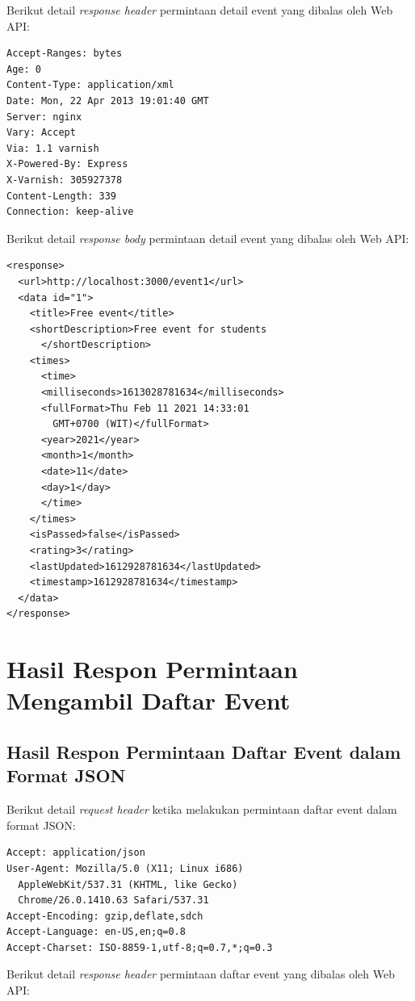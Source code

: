 \documentclass[a4paper, 12pt, oneside]{report}
\begin{document}
Berikut detail \textit{response header} permintaan detail event yang dibalas oleh Web API:

\begin{lstlisting}[frame=single]
Accept-Ranges: bytes 
Age: 0 
Content-Type: application/xml
Date: Mon, 22 Apr 2013 19:01:40 GMT 
Server: nginx 
Vary: Accept 
Via: 1.1 varnish 
X-Powered-By: Express
X-Varnish: 305927378
Content-Length: 339 
Connection: keep-alive
\end{lstlisting}

Berikut detail \textit{response body} permintaan detail event yang dibalas oleh Web API:

\begin{lstlisting}[frame=single]
<response>
  <url>http://localhost:3000/event1</url>
  <data id="1">
    <title>Free event</title>
    <shortDescription>Free event for students
      </shortDescription>
    <times>
      <time>
      <milliseconds>1613028781634</milliseconds>
      <fullFormat>Thu Feb 11 2021 14:33:01 
        GMT+0700 (WIT)</fullFormat>
      <year>2021</year>
      <month>1</month>
      <date>11</date>
      <day>1</day>
      </time>
    </times>
    <isPassed>false</isPassed>
    <rating>3</rating>
    <lastUpdated>1612928781634</lastUpdated>
    <timestamp>1612928781634</timestamp>
  </data>
</response>
\end{lstlisting}

\section{Hasil Respon Permintaan Mengambil Daftar Event}

\subsection{Hasil Respon Permintaan Daftar Event dalam Format JSON}

Berikut detail \textit{request header} ketika melakukan permintaan daftar event dalam format JSON:

\begin{lstlisting}[frame=single]
Accept: application/json
User-Agent: Mozilla/5.0 (X11; Linux i686)
  AppleWebKit/537.31 (KHTML, like Gecko)
  Chrome/26.0.1410.63 Safari/537.31
Accept-Encoding: gzip,deflate,sdch
Accept-Language: en-US,en;q=0.8
Accept-Charset: ISO-8859-1,utf-8;q=0.7,*;q=0.3
\end{lstlisting}

Berikut detail \textit{response header} permintaan daftar event yang dibalas oleh Web API:
\end{document}
